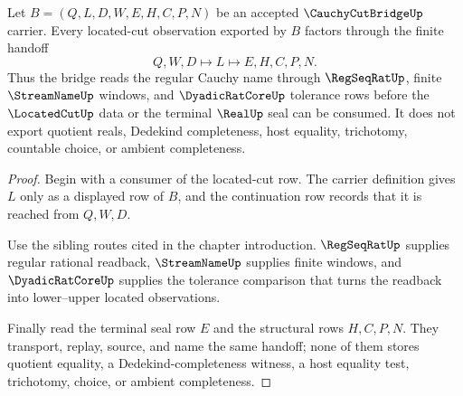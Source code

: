 \begin{theorem}
\label{thm:cauchy-cut-bridge-regular-located-handoff}
Let $B=(Q,L,D,W,E,H,C,P,N)$ be an accepted $\CauchyCutBridgeUp$ carrier. Every located-cut observation exported by $B$ factors through the finite handoff
$$
Q,W,D \longmapsto L \longmapsto E,H,C,P,N .
$$
Thus the bridge reads the regular Cauchy name through $\RegSeqRatUp$, finite $\StreamNameUp$ windows, and $\DyadicRatCoreUp$ tolerance rows before the $\LocatedCutUp$ data or the terminal $\RealUp$ seal can be consumed. It does not export quotient reals, Dedekind completeness, host equality, trichotomy, countable choice, or ambient completeness.
\end{theorem}
\begin{proof}
Begin with a consumer of the located-cut row. The carrier definition gives $L$ only as a displayed row of $B$, and the continuation row records that it is reached from $Q,W,D$.

Use the sibling routes cited in the chapter introduction. $\RegSeqRatUp$ supplies regular rational readback, $\StreamNameUp$ supplies finite windows, and $\DyadicRatCoreUp$ supplies the tolerance comparison that turns the readback into lower--upper located observations.

Finally read the terminal seal row $E$ and the structural rows $H,C,P,N$. They transport, replay, source, and name the same handoff; none of them stores quotient equality, a Dedekind-completeness witness, a host equality test, trichotomy, choice, or ambient completeness.
\end{proof}

\begin{closurestatus}{\CauchyCutBridgeUp}
  \theoryclosure{\seedClosure}
  \formalstatus{\unformalizedV}
\end{closurestatus}
